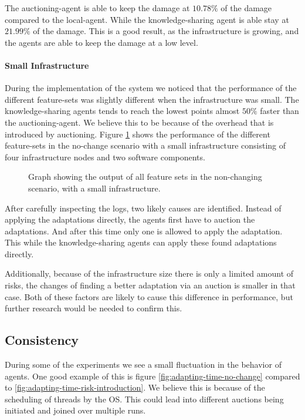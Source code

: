The auctioning-agent is able to keep the damage at $10.78\%$ of the damage compared to the local-agent. While the knowledge-sharing agent is able stay at $21.99\%$ of the damage. This is a good result, as the infrastructure is growing, and the agents are able to keep the damage at a low level.

\paragraph*{Small Infrastructure}
During the implementation of the system we noticed that the performance of the different feature-sets was slightly different when the infrastructure was small. The knowledge-sharing agents tends to reach the lowest points almost $50\%$ faster than the auctioning-agent. We believe this to be because of the overhead that is introduced by auctioning. Figure \ref{fig:small-infra-no-change} shows the performance of the different feature-sets in the no-change scenario with a small infrastructure consisting of four infrastructure nodes and two software components.

\begin{figure}[H]
    \centering
        
    \caption{Graph showing the output of all feature sets in the non-changing scenario, with a small infrastructure.}
    \label{fig:small-infra-no-change}
\end{figure}

After carefully inspecting the logs, two likely causes are identified. Instead of applying the adaptations directly, the agents first have to auction the adaptations. And after this time only one is allowed to apply the adaptation. This while the knowledge-sharing agents can apply these found adaptations directly. 

Additionally, because of the infrastructure size there is only a limited amount of risks, the changes of finding a better adaptation via an auction is smaller in that case. Both of these factors are likely to cause this difference in performance, but further research would be needed to confirm this.




\subsection{Consistency}
\label{ssec:consecutive-runs}
During some of the experiments we see a small fluctuation in the behavior of agents. One good example of this is figure \ref{fig:adapting-time-no-change} compared to \ref{fig:adapting-time-risk-introduction}. We believe this is because of the scheduling of threads by the OS. This could lead into different auctions being initiated and joined over multiple runs. 

